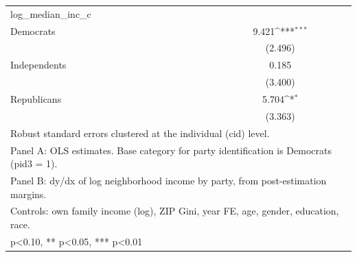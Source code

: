 {
\def\sym#1{\ifmmode^{#1}\else\(^{#1}\)\fi}
\begin{tabular}{l*{1}{c}}
\toprule
\midrule
log\_median\_inc\_c&                     \\
Democrats   &       9.421\sym{***}\\
            &     (2.496)         \\
Independents&       0.185         \\
            &     (3.400)         \\
Republicans &       5.704\sym{*}  \\
            &     (3.363)         \\
\bottomrule
\multicolumn{2}{l}{\footnotesize Robust standard errors clustered at the individual (cid) level.}\\
\multicolumn{2}{l}{\footnotesize Panel A: OLS estimates. Base category for party identification is Democrats (pid3 = 1).}\\
\multicolumn{2}{l}{\footnotesize Panel B: dy/dx of log neighborhood income by party, from post-estimation margins.}\\
\multicolumn{2}{l}{\footnotesize Controls: own family income (log), ZIP Gini, year FE, age, gender, education, race.}\\
\multicolumn{2}{l}{\footnotesize * p<0.10, ** p<0.05, *** p<0.01}\\
\end{tabular}
}
